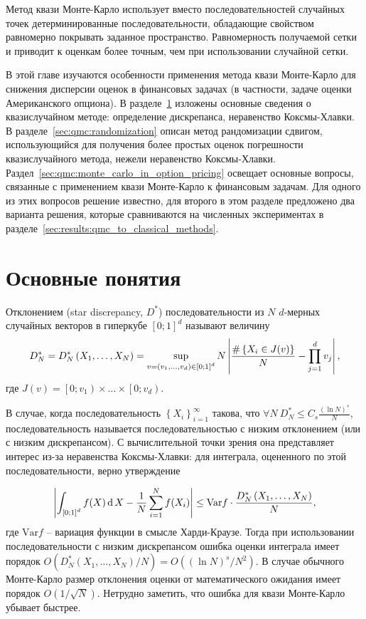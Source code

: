 Метод квази Монте-Карло \cite{Chi2004} использует вместо последовательностей случайных точек детерминированные последовательности, обладающие свойством равномерно покрывать заданное пространство. Равномерность получаемой сетки и приводит к оценкам более точным, чем при использовании случайной сетки.

В этой главе изучаются особенности применения метода квази Монте-Карло для снижения дисперсии оценок в финансовых задачах (в частности, задаче оценки Американского опциона). В разделе~\ref{sec:qmc:qmc_definition} изложены основные сведения о квазислучайном методе: определение дискрепанса, неравенство Коксмы-Хлавки. В разделе~\ref{sec:qmc:randomization} описан метод рандомизации сдвигом, использующийся для получения более простых оценок погрешности квазислучайного метода, нежели неравенство Коксмы-Хлавки. Раздел~\ref{sec:qmc:monte_carlo_in_option_pricing} освещает основные вопросы, связанные с применением квази Монте-Карло к финансовым задачам. Для одного из этих вопросов решение известно, для второго в этом разделе предложено два варианта решения, которые сравниваются на численных экспериментах в разделе~\ref{sec:results:qmc_to_classical_methods}. %

\section{Основные понятия} %
\label{sec:qmc:qmc_definition}

Отклонением (star discrepancy, $D^*$) последовательности из $N$ $d$-мерных случайных векторов в гиперкубе $\left[0;1\right]^d$ называют величину
$$D_N^* = D_N^*\left(X_1, \dots, X_N\right) = \sup_{v = (v_1, \dots, v_d) \in \left[0;1\right]^d} N \left\lvert\frac{\#\left\{ X_i \in J(v) \right\}}{N} - \prod_{j = 1}^d v_j\right\rvert,$$
где $J(v) = \left[0; v_1\right) \times \dots \times \left[0; v_d\right)$.

В случае, когда последовательность $\left\{ X_i\right\}_{i=1}^\infty$ такова, что $\forall N \: D_N^* \leq C_s \frac{(\ln N)^s}{N}$, последовательность называется последовательностью с низким отклонением (или с низким дискрепансом). С вычислительной точки зрения она представляет интерес из-за неравенства Коксмы-Хлавки: для интеграла, оцененного по этой последовательности, верно утверждение

\begin{equation}\label{eq:koksma-hlawka}
\left\lvert\int_{\left[0;1\right]^d} f(X) \operatorname{d} X - \frac{1}{N}\sum_{i=1}^N f(X_i)\right\rvert \leq \mathrm{Var}f\cdot \frac{D_N^*\left(X_1, \dots, X_N\right)}{N},
\end{equation}
где $\mathrm{Var}f$ -- вариация функции в смысле Харди-Краузе. Тогда при использовании последовательности с низким дискрепансом ошибка оценки интеграла имеет порядок $O\left(D_N^*\left(X_1, \dots, X_N\right)/N\right) = O\left((\ln N)^s / N^2\right)$. В случае обычного Монте-Карло размер отклонения оценки от математического ожидания имеет порядок $O(1 / \sqrt{N})$. Нетрудно заметить, что ошибка для квази Монте-Карло убывает быстрее.

